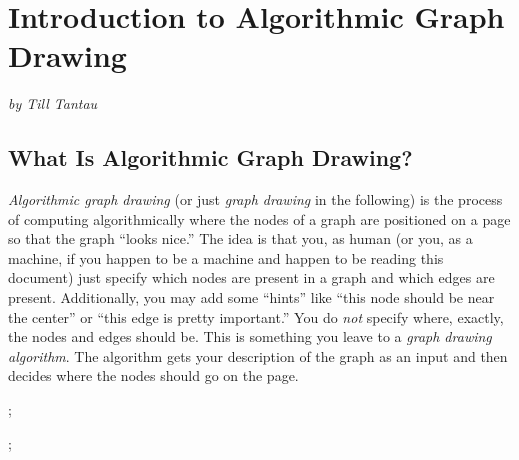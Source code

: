 %
%
%



\section{Introduction to Algorithmic Graph Drawing}

\emph{by Till Tantau}

\subsection{What Is Algorithmic Graph Drawing?}

\emph{Algorithmic graph drawing} (or just \emph{graph drawing} in the
following) is the process of computing algorithmically where the nodes of
a graph are positioned on a page so that the graph ``looks nice.'' The
idea is that you, as human (or you, as a machine, if you happen to be
a machine and happen to be reading this document) just specify which
nodes are present in a graph and which edges are
present. Additionally, you may add some ``hints'' like ``this node
should be near the center'' or ``this edge is pretty important.'' You
do \emph{not} specify where, exactly, the nodes and edges should
be. This is something you leave to a \emph{graph drawing
  algorithm}. The algorithm gets your description of the graph as an
input and then decides where the nodes should go on the page.

\begin{codeexample}[]
\tikz {};
\end{codeexample}

\begin{codeexample}[]
\tikz {};  
\end{codeexample}

